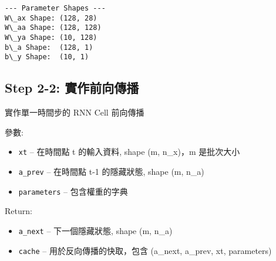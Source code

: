 \documentclass[11pt]{article}
\providecommand{\tightlist}{%
      \setlength{\itemsep}{0pt}\setlength{\parskip}{0pt}}
\begin{document}
    \begin{Verbatim}[commandchars=\\\{\}]
--- Parameter Shapes ---
W\_ax Shape: (128, 28)
W\_aa Shape: (128, 128)
W\_ya Shape: (10, 128)
b\_a Shape:  (128, 1)
b\_y Shape:  (10, 1)
    \end{Verbatim}

    \subsection{Step 2-2:
實作前向傳播}\label{step-2-2-ux5be6ux4f5cux524dux5411ux50b3ux64ad}

    實作單一時間步的 RNN Cell 前向傳播

參數:

\begin{itemize}
\tightlist
\item
  \texttt{xt} -- 在時間點 t 的輸入資料, shape (m, n\_x)，m 是批次大小
\item
  \texttt{a\_prev} -- 在時間點 t-1 的隱藏狀態, shape (m, n\_a)
\item
  \texttt{parameters} -- 包含權重的字典
\end{itemize}

Return:

\begin{itemize}
\tightlist
\item
  \texttt{a\_next} -- 下一個隱藏狀態, shape (m, n\_a)
\item
  \texttt{cache} -- 用於反向傳播的快取，包含 (a\_next, a\_prev, xt,
  parameters)
\end{itemize}
\end{document}
